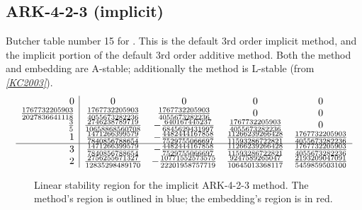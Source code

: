 \documentclass[letterpaper,10pt,english]{sphinxmanual}
\begin{document}
\subsection{ARK-4-2-3 (implicit)}
\label{Butcher:ark-4-2-3-implicit}\label{Butcher:butcher-ark-4-2-3-i}
Butcher table number 15
for {\hyperref[c_interface/User_callable:c.ARKodeSetIRKTableNum]{\emph{}}}.  This is
the default 3rd order implicit method, and the implicit portion of the
default 3rd order additive method.  Both the method and embedding are
A-stable; additionally the method is L-stable (from \label{Butcher:id14}{\hyperref[References:kc2003]{\emph{{[}KC2003{]}}}}).
\begin{gather}
\begin{split}\begin{array}{r|cccc}
  0 & 0 & 0 & 0 & 0 \\
  \frac{1767732205903}{2027836641118} & \frac{1767732205903}{4055673282236} & \frac{1767732205903}{4055673282236} & 0 & 0 \\
  \frac{3}{5} & \frac{2746238789719}{10658868560708} & -\frac{640167445237}{6845629431997} & \frac{1767732205903}{4055673282236} & 0 \\
  1 & \frac{1471266399579}{7840856788654} & -\frac{4482444167858}{7529755066697} & \frac{11266239266428}{11593286722821} & \frac{1767732205903}{4055673282236} \\
  \hline
  3 & \frac{1471266399579}{7840856788654} & -\frac{4482444167858}{7529755066697} & \frac{11266239266428}{11593286722821} & \frac{1767732205903}{4055673282236} \\
  2 & \frac{2756255671327}{12835298489170} & -\frac{10771552573575}{22201958757719} & \frac{9247589265047}{10645013368117} & \frac{2193209047091}{5459859503100}
\end{array}\end{split}\notag
\end{gather}\begin{figure}[htbp]
\centering
\capstart

\caption{Linear stability region for the implicit ARK-4-2-3 method.  The method's
region is outlined in blue; the embedding's region is in red.}\end{figure}
\end{document}
